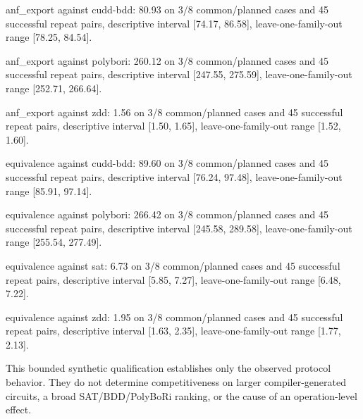 anf\_export against cudd-bdd: 80.93 on 3/8 common/planned cases and 45 successful repeat pairs, descriptive interval [74.17, 86.58], leave-one-family-out range [78.25, 84.54].

anf\_export against polybori: 260.12 on 3/8 common/planned cases and 45 successful repeat pairs, descriptive interval [247.55, 275.59], leave-one-family-out range [252.71, 266.64].

anf\_export against zdd: 1.56 on 3/8 common/planned cases and 45 successful repeat pairs, descriptive interval [1.50, 1.65], leave-one-family-out range [1.52, 1.60].

equivalence against cudd-bdd: 89.60 on 3/8 common/planned cases and 45 successful repeat pairs, descriptive interval [76.24, 97.48], leave-one-family-out range [85.91, 97.14].

equivalence against polybori: 266.42 on 3/8 common/planned cases and 45 successful repeat pairs, descriptive interval [245.58, 289.58], leave-one-family-out range [255.54, 277.49].

equivalence against sat: 6.73 on 3/8 common/planned cases and 45 successful repeat pairs, descriptive interval [5.85, 7.27], leave-one-family-out range [6.48, 7.22].

equivalence against zdd: 1.95 on 3/8 common/planned cases and 45 successful repeat pairs, descriptive interval [1.63, 2.35], leave-one-family-out range [1.77, 2.13].

This bounded synthetic qualification establishes only the observed protocol behavior. They do not determine competitiveness on larger compiler-generated circuits, a broad SAT/BDD/PolyBoRi ranking, or the cause of an operation-level effect.
